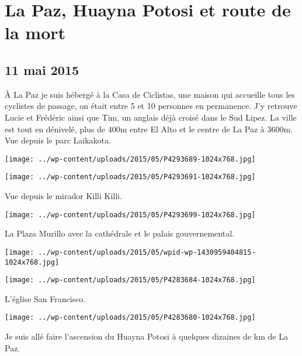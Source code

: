\chapter{La Paz, Huayna Potosi et route de la mort}
\section*{11 mai 2015}
À La Paz je suis hébergé à la Casa de Ciclistas, une maison qui accueille tous les cyclistes de passage, on était entre 5 et 10 personnes en permanence. \newline
 J'y retrouve Lucie et Frédéric ainsi que Tim, un anglais déjà croisé dans le Sud Lipez. \newline
 La ville est tout en dénivelé, plus de 400m entre El Alto et le centre de La Paz à 3600m. \newline
 Vue depuis le parc Laikakota. \newline
 \newline
\centerline{\texttt{[image: ../wp-content/uploads/2015/05/P4293689-1024x768.jpg]} } 
 \newline
 \newline
\centerline{\texttt{[image: ../wp-content/uploads/2015/05/P4293691-1024x768.jpg]} } 
 \newline
 Vue depuis le mirador Killi Killi. \newline
 \newline
\centerline{\texttt{[image: ../wp-content/uploads/2015/05/P4293699-1024x768.jpg]} } 
 \newline
 La Plaza Murillo avec la cathédrale et le palais gouvernemental. \newline
 \newline
\centerline{\texttt{[image: ../wp-content/uploads/2015/05/wpid-wp-1430959404815-1024x768.jpg]} } 
 \newline
 \newline
\centerline{\texttt{[image: ../wp-content/uploads/2015/05/P4283684-1024x768.jpg]} } 
 \newline
 L'église San Francisco. \newline
 \newline
\centerline{\texttt{[image: ../wp-content/uploads/2015/05/P4283680-1024x768.jpg]} } 
 \newline
 Je suis allé faire l'ascension du Huayna Potosi à quelques dizaines de km de La Paz. \newline
 \newline
